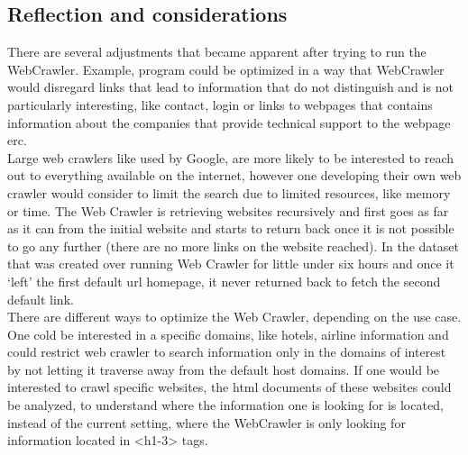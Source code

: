 \subsection{Reflection and considerations}
There are several adjustments that became apparent after trying to run the WebCrawler. Example, program could be optimized in a way that WebCrawler would disregard links that lead to information that do not distinguish and is not particularly interesting, like contact, login or links to webpages that contains information about the companies that provide technical support to the webpage erc.\\
Large web crawlers like used by Google, are more likely to be interested to reach out to everything available on the internet, however one developing their own web crawler would consider to limit the search due to limited resources, like memory or time. The Web Crawler is retrieving websites recursively and first goes as far as it can from the initial website and starts to return back once it is not possible to go any further (there are no more links on the website reached). In the dataset that was created over running Web Crawler for little under six hours and once it ‘left’ the first default url homepage, it never returned back to fetch the second default link.\\
There are different ways to optimize the Web Crawler, depending on the use case. One cold be interested in a specific domains, like hotels, airline information and could restrict web crawler to search information only in the domains of interest by not letting it traverse away from the default host domains.
If one would be interested to crawl specific websites, the html documents of these websites could be analyzed, to understand where the information one is looking for is located, instead of the current setting, where the WebCrawler is only looking for information located in <h1-3> tags.

